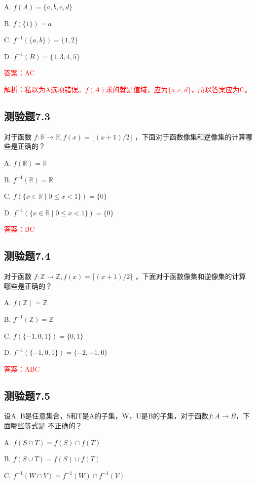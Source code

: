 \documentclass[UTF8, heading=true]{ctexart}
\begin{document}
A. 
$f(A)=\{a, b, c, d\}$

B. 
$f(\{1\})=a$

C. $f^{-1}(\{a, b\})=\{1,2\}$

D. $f^{-1}(B)=\{1,3,4,5\}$

\textcolor{red}{答案：AC}

\textcolor{red}{解析：私以为A选项错误。$f(A)$求的就是值域，应为$\{ a,c,d \}$，所以答案应为C。}

\subsection{测验题7.3}

对于函数 $f: \mathbb{R} \rightarrow \mathbb{R}, f(x)=\lfloor(x+1) / 2\rfloor$ ，下面对于函数像集和逆像集的计算哪些是正确的？

A. $f(\mathbb{R})=\mathbb{R}$

B. $f^{-1}(\mathbb{R})=\mathbb{R}$

C. $f(\{x \in \mathbb{R} \mid 0 \leq x<1\})=\{0\}$

D. $f^{-1}(\{x \in \mathbb{R} \mid 0 \leq x<1\})=\{0\}$

\textcolor{red}{答案：BC}

\subsection{测验题7.4}

对于函数 $f: \mathbb{Z} \rightarrow \mathbb{Z}, f(x)=\lceil(x+1) / 2\rceil$ ，下面对于函数像集和逆像集的计算哪些是正确的？

A. $
f(\mathbb{Z})=\mathbb{Z}
$


B. $
f^{-1}(\mathbb{Z})=\mathbb{Z}
$


C. $
f(\{-1,0,1\})=\{0,1\}
$


D. $
f^{-1}(\{-1,0,1\})=\{-2,-1,0\}
$

\textcolor{red}{答案：ABC}

\subsection{测验题7.5}

设A. B是任意集合，S和T是A的子集，W，U是B的子集，对于函数$f:A\rightarrow B$，下面哪些等式是
不正确的？

A. $f(S \cap T)=f(S) \cap f(T)$

B. $f(S \cup T)=f(S) \cup f(T)$

C. $f^{-1}(W \cap V)=f^{-1}(W) \cap f^{-1}(V)$
\end{document}
